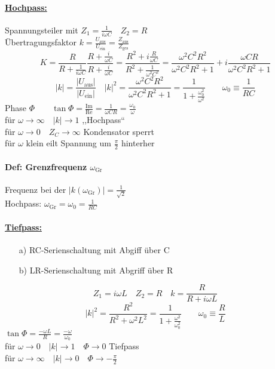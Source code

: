 \documentclass[titlepage,12pt,a4paper,ngerman]{report}
\newcommand{\tx}[1]{\textrm{#1}}
\begin{document}
\paragraph{\underline{Hochpass:}}
Spannungsteiler mit $ Z_1 = \frac{1}{i \omega C} \quad Z_2 = R $\\
Übertragungsfaktor $ k = \frac{U_{\tx{aus}}}{U_{\tx{ein}}} = \frac{Z_{\tx{aus}}}{Z_{\tx{ges}}} $
$$ K = \frac{R}{R + \frac{1}{i \omega C}} \frac{R + \frac{i}{\omega C}}{R + \frac{i}{\omega C}} = \frac{R^2 + i \frac{R}{\omega C}}{ R^2 + \frac{1}{\omega^2 C^2}} = \frac{\omega^2 C^2 R^2}{\omega^2 C^2 R^2 + 1} + i \frac{\omega C R}{\omega^2 C^2 R^2 + 1} $$
$$ |k| = \frac{|U_{\tx{aus}} |}{| U_{\tx{ein}} |} \quad |k|^2 = \frac{\omega ^2 C^2 R^2}{\omega^2 C^2 R^2 + 1} = \frac{1}{1+ \frac{\omega_0^2}{\omega^2}} \qquad \omega_0 \equiv \frac{1}{RC} $$
Phase $ \Phi \qquad \tan \Phi = \frac{\tx{Im}}{\tx{Re}} = \frac{1}{\omega C R} = \frac{\omega_0}{\omega} $\\
für $ \omega \rightarrow \infty \quad |k| \rightarrow 1 $ ,,Hochpass``\\
für $ \omega \rightarrow 0 \quad Z_C \rightarrow\infty $ Kondensator sperrt\\
für $ \omega $ klein eilt Spannung um $ \frac{\pi}{2} $ hinterher
\paragraph{Def: Grenzfrequenz $ \omega_{\tx{Gr}} $}
Frequenz bei der $ |k(\omega_{\tx{Gr}})| = \frac{1}{\sqrt{2}} $\\
Hochpass: $ \omega_{\tx{Gr}} = \omega_0 = \frac{1}{RC} $
\paragraph{\underline{Tiefpass:}}
\begin{itemize}
	\item[a)] RC-Serienschaltung mit Abgiff über C
	\item[b)] LR-Serienschaltung mit Abgriff über R
\end{itemize}
$$ Z_1 = i \omega L \quad Z_2 = R \quad k = \frac{R}{R+i \omega L} $$
$$ |k|^2 = \frac{R^2}{R^2 + \omega^2 L^2} = \frac{1}{1 + \frac{\omega^2}{\omega_0^2}} \qquad \omega_0 \equiv \frac{R}{L} $$
$ \tan \Phi = \frac{-\omega L}{R} = \frac{-\omega}{\omega_0} $\\
für $ \omega\rightarrow 0 \quad |k| \rightarrow 1 \quad \Phi \rightarrow 0 $ Tiefpass\\
für $ \omega \rightarrow \infty \quad |k| \rightarrow 0 \quad \Phi \rightarrow -\frac{\pi}{2} $\\
\end{document}
